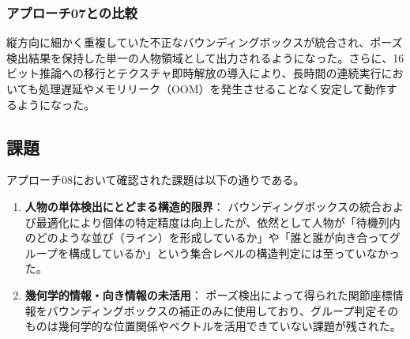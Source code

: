 \subsubsection{アプローチ07との比較}
縦方向に細かく重複していた不正なバウンディングボックスが統合され、ポーズ検出結果を保持した単一の人物領域として出力されるようになった。さらに、16ビット推論への移行とテクスチャ即時解放の導入により、長時間の連続実行においても処理遅延やメモリリーク（OOM）を発生させることなく安定して動作するようになった。

\subsection{課題}
アプローチ08において確認された課題は以下の通りである。

\begin{enumerate}
    \item \textbf{人物の単体検出にとどまる構造的限界}：
    バウンディングボックスの統合および最適化により個体の特定精度は向上したが、依然として人物が「待機列内のどのような並び（ライン）を形成しているか」や「誰と誰が向き合ってグループを構成しているか」という集合レベルの構造判定には至っていなかった。
    \item \textbf{幾何学的情報・向き情報の未活用}：
    ポーズ検出によって得られた関節座標情報をバウンディングボックスの補正のみに使用しており、グループ判定そのものは幾何学的な位置関係やベクトルを活用できていない課題が残された。
\end{enumerate}

\clearpage
